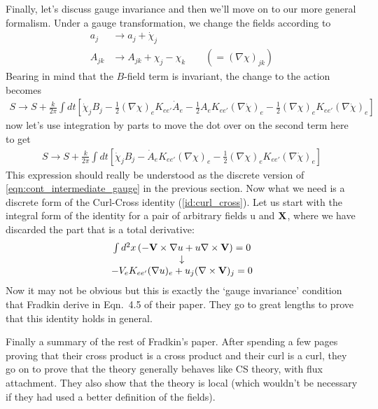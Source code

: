 \documentclass[11pt, oneside]{article} %
\numberwithin{equation}{section}
\begin{document}
Finally, let's discuss gauge invariance and then we'll move on to our more general formalism. Under a gauge transformation, we change the fields according to
\begin{align}
    a_j &\rightarrow a_j + \dot \chi_j\\
    A_{jk} &\rightarrow A_{jk} + \chi_j - \chi_k \qquad (=(\nabla \chi)_{jk})
\end{align}
Bearing in mind that the $B$-field term is invariant, the change to the action becomes
\begin{align}
    S \rightarrow S + \frac k{2\pi} \int dt
    \left [ 
        \dot \chi_j B_j 
        - \frac 12 (\nabla \chi)_e K_{ee'} \dot A_e
        - \frac 12 A_e K_{ee'} (\nabla \dot \chi)_e 
        - \frac 12 (\nabla \chi)_e K_{ee'} (\nabla \dot \chi)_e 
    \right ]
\end{align}
now let's use integration by parts to move the dot over on the second term here to get
\begin{align}
    S \rightarrow S + \frac k{2\pi} \int dt
    \left [ 
        \dot \chi_j B_j 
        -  \dot A_e K_{ee'} (\nabla \chi)_e 
        - \frac 12 (\nabla \chi)_e K_{ee'} (\nabla \dot \chi)_e 
    \right ]
\end{align}
This expression should really be understood as the discrete version of \cref{eqn:cont_intermediate_gauge} in the previous section. Now what we need is a discrete form of the Curl-Cross identity (\cref{id:curl_cross}). Let us start with the integral form of the identity for a pair of arbitrary fields u and $\textbf X$, where we have discarded the part that is a total derivative:
\begin{align}
\begin{matrix}
      \int d^2x 
      \left ( -\textbf{V} \times \nabla u   + u \nabla \times \textbf{V} \right ) = 0\\
    \downarrow \\
    - V_e K_{ee'} (\nabla u)_e + u_j (\nabla \times \textbf V)_j = 0
\end{matrix}
\end{align}
Now it may not be obvious but this is exactly the `gauge invariance' condition that Fradkin derive in Eqn.~4.5 of their paper. They go to great lengths to prove that this identity holds in general.

Finally a summary of the rest of Fradkin's paper. After spending a few pages proving that their cross product is a cross product and their curl is a curl, they go on to prove that the theory generally behaves like CS theory, with flux attachment. They also show that the theory is local (which wouldn't be necessary if they had used a better definition of the fields).
\end{document}
